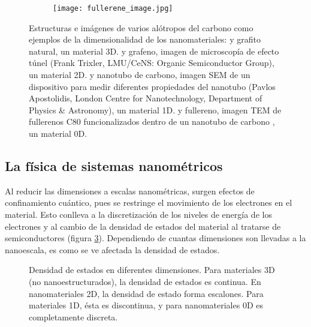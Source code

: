 \begin{figure}
\begin{subfigure}[b]{0.2\textwidth}
		\texttt{[image: fullerene\_image.jpg]}
		\caption{}
		\label{fig:fullerene_image}
	\end{subfigure}
	\caption[Alótropos del carbono mostrando las diferentes dimensionalidades de los nanomateriales]{Estructuras e imágenes de varios alótropos del carbono como ejemplos de la dimensionalidad de los nanomateriales:   y  grafito natural, un material 3D.  y  grafeno, imagen de microscopía de efecto túnel (Frank Trixler, LMU/CeNS: Organic Semiconductor Group), un material 2D.  y  nanotubo de carbono, imagen SEM de un dispositivo para medir diferentes propiedades del nanotubo (Pavlos Apostolidis, London Centre for Nanotechnology, Department of Physics \& Astronomy), un material 1D.  y  fullereno, imagen TEM de fullerenos C80 funcionalizados dentro de un nanotubo de carbono \citep{Gimenez2011}, un material 0D.}
	\label{fig:carbon_allotropes}
\end{figure}

\subsection*{La física de sistemas nanométricos}
Al reducir las dimensiones a escalas nanométricas, surgen efectos de confinamiento cuántico, pues se restringe el movimiento de los electrones en el material. Esto conlleva a la discretización de los niveles de energía de los electrones y al cambio de la densidad de estados del material al tratarse de semiconductores (figura \ref{fig:DoE}). Dependiendo de cuantas dimensiones son llevadas a la nanoescala, es como se ve afectada la densidad de estados.

\begin{figure}[h!]
	\centering
	\caption[Densidad de estados en diferentes dimensionalidades]{Densidad de estados en diferentes dimensiones. Para materiales 3D (no nanoestructurados), la densidad de estados es continua. En nanomateriales 2D, la densidad de estado forma escalones. Para materiales 1D, ésta es discontinua, y para nanomateriales 0D es completamente discreta. }
	\label{fig:DoE}
\end{figure}

